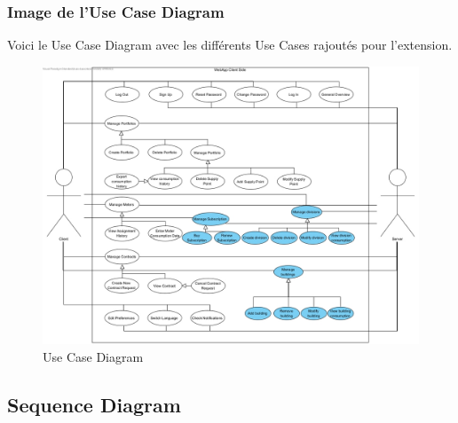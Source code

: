 \documentclass{report}
\begin{document}
\\\\\\
\newpage
\subsubsection{Image de l'Use Case Diagram}
Voici le Use Case Diagram avec les différents Use Cases rajoutés pour l'extension.
\begin{figure}[h]
	\centering
	\includegraphics[width=1.3\textwidth]{UCD Client}
	\caption{Use Case Diagram}
	\label{fig:usdClient}
\end{figure}

\subsection{Sequence Diagram}
\end{document}
